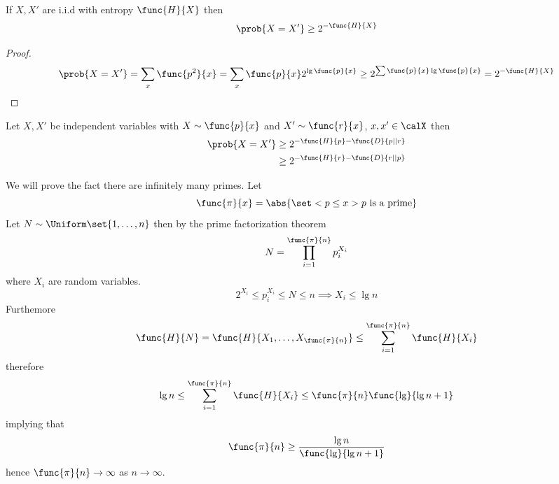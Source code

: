\begin{lemma}
      If \(X,X'\) are i.i.d with entropy \(\func{H}{X}\) then 
      \begin{equation*}
            \prob{X = X'} \geq 2^{-\func{H}{X}}
      \end{equation*}
\end{lemma}

\begin{proof}
      \begin{align*}
            \prob{X = X'} = \sum_x \func{p^2}{x} = \sum_x \func{p}{x} 2^ {\lg\func{p}{x}} \geq 2^{\sum \func{p}{x} \lg \func{p}{x}} = 2^{-\func{H}{X}}
      \end{align*}
\end{proof}

\begin{corollary}
      Let \(X,X'\) be independent variables with \(X \sim \func{p}{x}\) and \(X' \sim \func{r}{x}\), \(x,x' \in \calX\) then 
      \begin{align*}
            \prob{X = X'} &\geq 2^{-\func{H}{p} - \func{D}{p || r}}\\
            &\geq 2^{- \func{H}{r} - \func{D}{r || p}}
      \end{align*}
\end{corollary}

\begin{example}
      We will prove the fact there are infinitely many primes. Let 
      \begin{equation*}
            \func{\pi}{x} = \abs{\set<p \leq x>{p \ \text{is a prime}}}
      \end{equation*}
      Let \(N \sim \Uniform \set{1,\dots , n}\) then by the prime factorization theorem 
      \begin{equation*}
            N = \prod_{i = 1}^{\func{\pi}{n}} p_i^{X_i}
      \end{equation*}
      where \(X_i\) are random variables. 
      \begin{equation*}
            2^{X_i} \leq p_i^{X_i} \leq N \leq n \implies X_i \leq \lg n
      \end{equation*}
      Furthemore 
      \begin{equation*}
            \func{H}{N} = \func{H}{X_1, \dots , X_{\func{\pi}{n}}} \leq \sum_{i = 1}^{\func{\pi}{n}} \func{H}{X_i}
      \end{equation*}
      therefore 
      \begin{equation*}
            \lg n \leq \sum_{i = 1}^{\func{\pi}{n}}  \func{H}{X_i} \leq \func{\pi}{n} \func{\lg}{\lg n + 1}
      \end{equation*}
      implying that 
      \begin{equation*}
            \func{\pi}{n} \geq \dfrac{\lg n}{\func{\lg}{\lg n + 1}}
      \end{equation*}
      hence \(\func{\pi}{n} \to \infty\) as \(n \to \infty\).
\end{example}